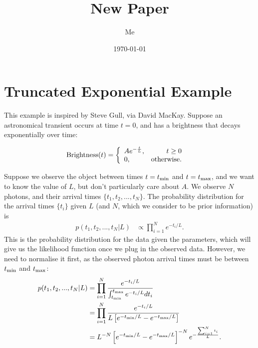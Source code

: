 \documentclass[a4paper, 11pt]{article}
\title{New Paper}
\author{Me}
\date{\today}
\begin{document}


\setlength{\parindent}{0pt}
\setlength{\parskip}{8pt}

\section{Truncated Exponential Example}
This example is inspired by Steve Gull, via David MacKay.
Suppose an astronomical transient
occurs at time $t=0$, and has a brightness that
decays exponentially over time:

\begin{align}
\textnormal{Brightness}(t) &=
\left\{
\begin{array}{lr}
Ae^{-\frac{t}{L}}, & t \geq 0\\
0,                 & \textnormal{otherwise}.
\end{array}
\right.
\end{align}

Suppose we observe the object between times $t=t_{\rm min}$ and
$t=t_{\rm max}$, and we want to know the value of $L$, but don't
particularly care about $A$. We observe $N$ photons, and their
arrival times $\{t_1, t_2, ..., t_N\}$.
The probability distribution for the arrival times
$\{t_i\}$
given $L$ (and $N$, which we consider to be prior information)
is
\begin{align}
p(t_1, t_2, ..., t_N | L)
&\propto \prod_{i=1}^N e^{-t_i/L}.
\end{align}
This is the probability distribution for the data given the
parameters, which will give us the likelihood function once
we plug in the observed data. However, we need to normalise
it first, as the observed photon arrival times must be between
$t_{\rm min}$ and $t_{\rm max}$:
\begin{align}
p(t_1, t_2, ..., t_N | L)
&= \prod_{i=1}^N
\frac{e^{-t_i/L}}
     {\int_{t_{\rm min}}^{t_{\rm max}} e^{-t_i/L} dt_i}\\
&= \prod_{i=1}^N
\frac{e^{-t_i/L}}
     {L\left[e^{-t_{\rm min}/L} - e^{-t_{\rm max}/L}\right]}\\
&= L^{-N}\left[e^{-t_{\rm min}/L} - e^{-t_{\rm max}/L}\right]^{-N}
e^{-\frac{\sum_{i=1}^N t_i}{L}}.
\end{align}







{}
\end{document}
